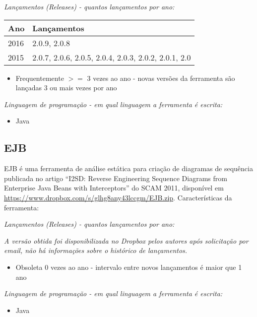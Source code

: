 \begin{description}

  \item {\it Lançamentos ({\it Releases}) - quantos lançamentos por ano:}
    \begin{table}[h!]
      \centering
      \begin{tabular}{| l | l |}
        \hline
        Ano  & Lançamentos                                          \\
        \hline
        2016 & 2.0.9, 2.0.8                                         \\
        2015 & 2.0.7, 2.0.6, 2.0.5, 2.0.4, 2.0.3, 2.0.2, 2.0.1, 2.0 \\
        \hline
      \end{tabular}
    \end{table}
    \begin{itemize}
      \item Frequentemente $>=$ 3 vezes ao ano - novas versões da ferramenta são lançadas 3 ou mais vezes por ano
    \end{itemize}

  \item {\it Linguagem de programação - em qual linguagem a ferramenta é escrita:}
    \begin{itemize}
      \item Java
    \end{itemize}

\end{description}

\subsection{EJB}

EJB é uma ferramenta de análise estática para criação de diagramas de sequência
publicada no artigo ``I2SD: Reverse Engineering Sequence Diagrams from
Enterprise Java Beans with Interceptors'' do SCAM 2011, disponível em
\url{https://www.dropbox.com/s/glhg8any43lccgm/EJB.zip}. Características da
ferramenta:

\begin{description}

  \item {\it Lançamentos ({\it Releases}) - quantos lançamentos por ano:}

    {\it A versão obtida foi disponibilizada no Dropbox pelos autores após solicitação
    por email, não há informações sobre o histórico de lançamentos.}

    \begin{itemize}
      \item Obsoleta $0$ vezes ao ano - intervalo entre novos lançamentos é maior que 1 ano
    \end{itemize}

  \item {\it Linguagem de programação - em qual linguagem a ferramenta é escrita:}
    \begin{itemize}
      \item Java
    \end{itemize}

\end{description}

